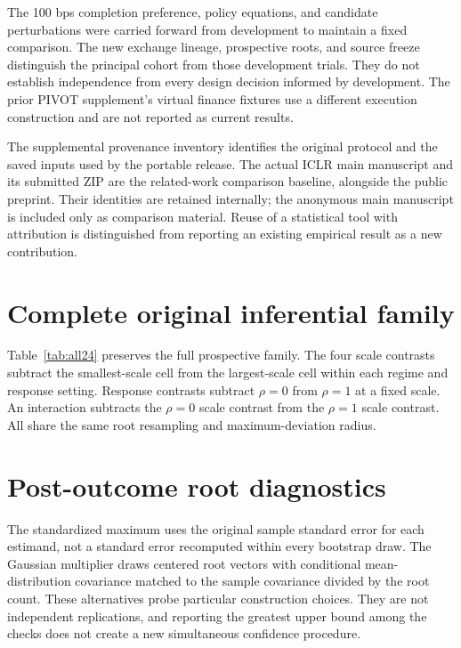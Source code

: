 \documentclass[10pt,letterpaper]{article}
\begin{document}
The 100 bps completion preference, policy equations, and candidate perturbations were carried forward from development to maintain a fixed comparison. The new exchange lineage, prospective roots, and source freeze distinguish the principal cohort from those development trials. They do not establish independence from every design decision informed by development. The prior PIVOT supplement's virtual finance fixtures use a different execution construction and are not reported as current results.

The supplemental provenance inventory identifies the original protocol and the saved inputs used by the portable release. The actual ICLR main manuscript and its submitted ZIP are the related-work comparison baseline, alongside the public preprint. Their identities are retained internally; the anonymous main manuscript is included only as comparison material. Reuse of a statistical tool with attribution is distinguished from reporting an existing empirical result as a new contribution.

\section{Complete original inferential family}\label{app:all24}
Table~\ref{tab:all24} preserves the full prospective family. The four scale contrasts subtract the smallest-scale cell from the largest-scale cell within each regime and response setting. Response contrasts subtract $\rho=0$ from $\rho=1$ at a fixed scale. An interaction subtracts the $\rho=0$ scale contrast from the $\rho=1$ scale contrast. All share the same root resampling and maximum-deviation radius.


\section{Post-outcome root diagnostics}\label{app:root-diagnostics}

The standardized maximum uses the original sample standard error for each estimand, not a standard error recomputed within every bootstrap draw. The Gaussian multiplier draws centered root vectors with conditional mean-distribution covariance matched to the sample covariance divided by the root count. These alternatives probe particular construction choices. They are not independent replications, and reporting the greatest upper bound among the checks does not create a new simultaneous confidence procedure.
\end{document}
